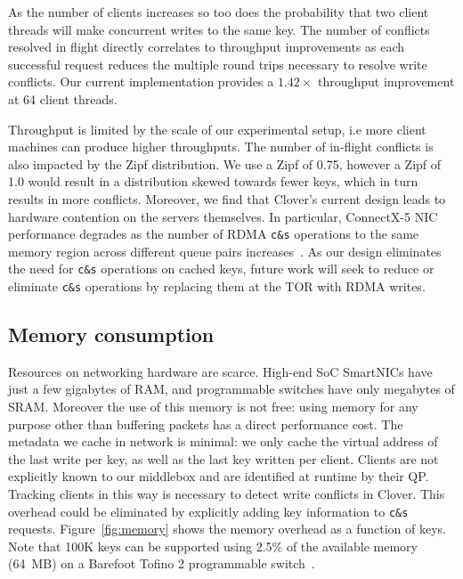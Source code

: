As the number of clients increases so too does the probability that
two client threads will make concurrent writes to the same key. The
number of conflicts resolved in flight directly correlates to
throughput improvements as each successful request reduces the
multiple round trips necessary to resolve write conflicts. Our current
implementation provides a $1.42\times$ throughput improvement at 64
client threads.

Throughput is limited by the scale of our experimental setup, i.e more
client machines can produce higher throughputs.  
%
%
  The number of in-flight conflicts
is also impacted by the Zipf distribution. We use a Zipf of 0.75,
however a Zipf of 1.0 would result in a distribution skewed towards
fewer keys, which in turn results in more conflicts. Moreover, we find
that Clover's current design leads to hardware contention on the
servers themselves.  In particular, ConnectX-5 NIC performance
degrades as the number of RDMA \texttt{c\&s} operations to the same
memory region across different queue pairs
increases~\cite{design-guidelines}. As our design eliminates the need
for \texttt{c\&s} operations on cached keys, future work will seek
to reduce or eliminate \texttt{c\&s} operations by replacing them at the TOR
with RDMA writes.

\subsection{Memory consumption}

Resources on networking hardware are scarce. High-end SoC SmartNICs
have just a few gigabytes of RAM, and programmable switches have only
megabytes of SRAM. Moreover the use of this memory is not free: using
memory for any purpose other than buffering packets has a direct
performance cost.
The metadata we cache in network is minimal:
we only
cache the virtual address of the last write per key,
as well as the last key written per client. Clients are not
explicitly known to our middlebox and are identified at runtime by
their QP. Tracking clients in this way is necessary to detect write
conflicts in Clover. This overhead could be eliminated by explicitly
adding key information to \texttt{c\&s} requests.
%
Figure~\ref{fig:memory} shows the memory overhead as a function of
keys. Note that 100K keys can be supported using 2.5\% of the available
memory (64~MB) on a Barefoot Tofino 2 programmable switch~\cite{tofino2}.

